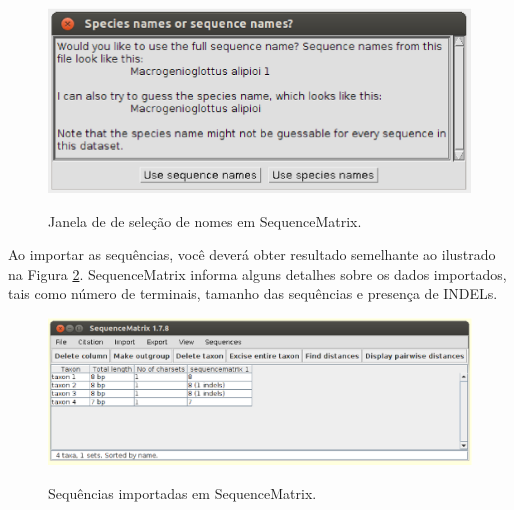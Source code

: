 \begin{refsection}
  \begin{figure}[H]
      {\includegraphics[scale=0.7]{figures/tut7/seqmatrix_2b.eps}}
	{\caption[Janela de seleção de nomes em SequenceMatrix]{Janela de de seleção de nomes em SequenceMatrix.}\label{tut7:fig:seqmatrix_2b}}
  \end{figure}


Ao importar as sequências, você deverá obter resultado semelhante ao ilustrado na Figura \ref{tut7:fig:seqmatrix_3}. SequenceMatrix informa alguns detalhes sobre os dados importados, tais como número de terminais, tamanho das sequências e presença de INDELs.\\

  \begin{figure}[H]
      {\includegraphics[scale=0.5]{figures/tut7/seqmatrix_3.eps}}
	{\caption[Sequências importadas em SequenceMatrix]{Sequências importadas em SequenceMatrix.}\label{tut7:fig:seqmatrix_3}}
  \end{figure}



\end{refsection}
